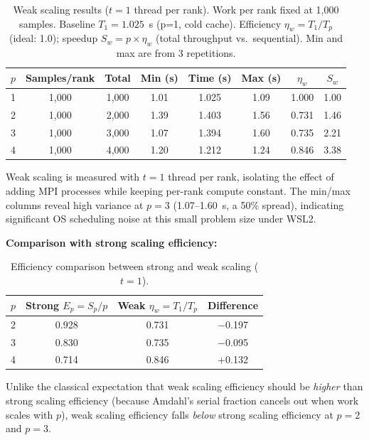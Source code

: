 \documentclass[12pt,a4paper]{article}
\begin{document}
\begin{table}[H]
  \centering
  \caption{Weak scaling results ($t=1$ thread per rank). Work per rank fixed
           at 1{,}000 samples. Baseline $T_1 = 1.025$~s (p=1, cold cache).
           Efficiency $\eta_w = T_1 / T_p$ (ideal: 1.0);
           speedup $S_w = p \times \eta_w$ (total throughput vs.\ sequential).
           Min and max are from 3 repetitions.}
  \label{tab:weak}
  \begin{tabular}{cc c ccc cc}
    \toprule
    $p$ & Samples/rank & Total & Min (s) & Time (s) & Max (s) & $\eta_w$ & $S_w$ \\
    \midrule
    1 & 1{,}000 & 1{,}000 & 1.01 & 1.025 & 1.09 & 1.000 & 1.00 \\
    2 & 1{,}000 & 2{,}000 & 1.39 & 1.403 & 1.56 & 0.731 & 1.46 \\
    3 & 1{,}000 & 3{,}000 & 1.07 & 1.394 & 1.60 & 0.735 & 2.21 \\
    4 & 1{,}000 & 4{,}000 & 1.20 & 1.212 & 1.24 & 0.846 & 3.38 \\
    \bottomrule
  \end{tabular}
\end{table}

Weak scaling is measured with $t=1$ thread per rank, isolating the effect
of adding MPI processes while keeping per-rank compute constant.
The min/max columns reveal high variance at $p=3$ (1.07--1.60~s, a 50\%
spread), indicating significant OS scheduling noise at this small
problem size under WSL2.

\textbf{Comparison with strong scaling efficiency:}

\begin{table}[H]
  \centering
  \caption{Efficiency comparison between strong and weak scaling ($t=1$).}
  \begin{tabular}{c cc c}
    \toprule
    $p$ & Strong $E_p = S_p/p$ & Weak $\eta_w = T_1/T_p$ & Difference \\
    \midrule
    2 & 0.928 & 0.731 & $-$0.197 \\
    3 & 0.830 & 0.735 & $-$0.095 \\
    4 & 0.714 & 0.846 & $+$0.132 \\
    \bottomrule
  \end{tabular}
\end{table}

Unlike the classical expectation that weak scaling efficiency should be
\emph{higher} than strong scaling efficiency (because Amdahl's serial
fraction cancels out when work scales with $p$), weak scaling efficiency
falls \emph{below} strong scaling efficiency at $p=2$ and $p=3$.
\end{document}
